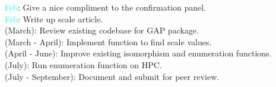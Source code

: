 \documentclass[preview]{standalone}
\begin{document}
\textcolor{cyan}{Feb}: Give a nice compliment to the confirmation panel.\\\textcolor{cyan}{Feb}: Write up scale article.\\(March): Review existing codebase for GAP package.\\(March - April): Implement function to find scale values.\\(April - June): Improve existing isomorphism and enumeration functions.\\(July): Run enumeration function on HPC.\\(July - September): Document and submit for peer review.\\
\end{document}
